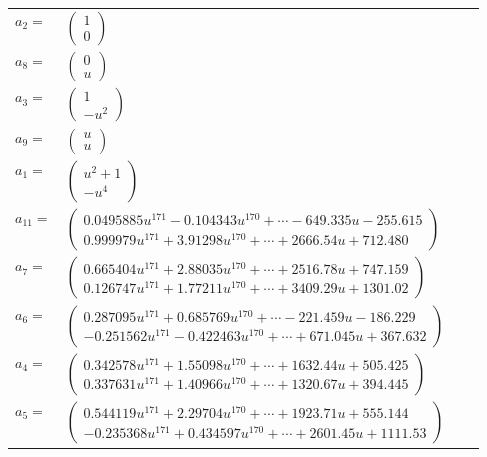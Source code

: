 \documentclass[1p]{elsarticle_modified}
\theoremstyle{definition}
\begin{document}
\begin{tabular}{m{7pt} m{180pt} m{7pt} m{180pt} }
\flushright $a_{2}=$&$\begin{pmatrix}1\\0\end{pmatrix}$ \\
\flushright $a_{8}=$&$\begin{pmatrix}0\\u\end{pmatrix}$ \\
\flushright $a_{3}=$&$\begin{pmatrix}1\\- u^2\end{pmatrix}$ \\
\flushright $a_{9}=$&$\begin{pmatrix}u\\u\end{pmatrix}$ \\
\flushright $a_{1}=$&$\begin{pmatrix}u^2+1\\- u^4\end{pmatrix}$ \\
\flushright $a_{11}=$&$\begin{pmatrix}0.0495885 u^{171}-0.104343 u^{170}+\cdots-649.335 u-255.615\\0.999979 u^{171}+3.91298 u^{170}+\cdots+2666.54 u+712.480\end{pmatrix}$ \\
\flushright $a_{7}=$&$\begin{pmatrix}0.665404 u^{171}+2.88035 u^{170}+\cdots+2516.78 u+747.159\\0.126747 u^{171}+1.77211 u^{170}+\cdots+3409.29 u+1301.02\end{pmatrix}$ \\
\flushright $a_{6}=$&$\begin{pmatrix}0.287095 u^{171}+0.685769 u^{170}+\cdots-221.459 u-186.229\\-0.251562 u^{171}-0.422463 u^{170}+\cdots+671.045 u+367.632\end{pmatrix}$ \\
\flushright $a_{4}=$&$\begin{pmatrix}0.342578 u^{171}+1.55098 u^{170}+\cdots+1632.44 u+505.425\\0.337631 u^{171}+1.40966 u^{170}+\cdots+1320.67 u+394.445\end{pmatrix}$ \\
\flushright $a_{5}=$&$\begin{pmatrix}0.544119 u^{171}+2.29704 u^{170}+\cdots+1923.71 u+555.144\\-0.235368 u^{171}+0.434597 u^{170}+\cdots+2601.45 u+1111.53\end{pmatrix}$ \\

\end{tabular}
\end{document}
